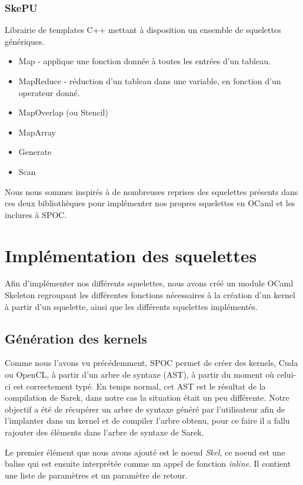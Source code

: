 \documentclass{report}
\begin{document}
\subsubsection{SkePU}

Librairie de templates C++ mettant à disposition un ensemble de squelettes génériques.

\begin{itemize}
\item Map\cite{refMap} - applique une fonction donnée à toutes les entrées d’un tableau.
\item MapReduce - réduction d’un tableau dans une variable, en fonction d’un operateur donné.
\item MapOverlap (ou Stencil)
\item MapArray
\item Generate
\item Scan
\end{itemize}

Nous nous sommes inspirés à de nombreuses reprises des squelettes présents dans ces deux bibliothèques pour implémenter nos propres squelettes en OCaml et les inclures à SPOC.

\newpage
\section{Implémentation des squelettes}

Afin d'implémenter nos différents squelettes, nous avons créé un module OCaml Skeleton regroupant les différentes fonctions nécessaires à la création d'un kernel à partir d'un squelette, ainsi que les différents squelettes implémentés. 

\subsection{Génération des kernels}

Comme nous l'avons vu précédemment, SPOC permet de créer des kernels, Cuda ou OpenCL, à partir d'un arbre de syntaxe (AST), à partir du moment où celui-ci est correctement typé. En temps normal, cet AST est le résultat de la compilation de Sarek, dans notre cas la situation était un peu différente. Notre objectif a été de récupérer un arbre de syntaxe généré par l'utilisateur afin de l'implanter dans un kernel et de compiler l'arbre obtenu, pour ce faire il a fallu rajouter des éléments dans l'arbre de syntaxe de Sarek.\newline

Le premier élément que nous avons ajouté est le noeud \textit{Skel}, ce noeud est une balise qui est ensuite interprétée comme un appel de fonction \textit{inline}. Il contient une liste de paramètres et un paramètre de retour. \newline
\end{document}
